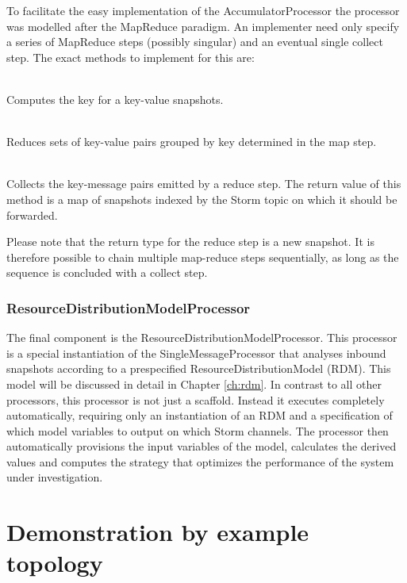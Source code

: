 To facilitate the easy implementation of the AccumulatorProcessor the processor was modelled after the MapReduce paradigm\cite{map-reduce}. An implementer need only specify a series of MapReduce steps (possibly singular) and an eventual single collect step.  The exact methods to implement for this are: 
\begin{description}[font=\normalfont]
\item[\emph{map(Message m) : String}] \hfill \\ Computes the key for a key-value snapshots.
\item[\emph{reduce(String key, List\textless Message\textgreater\ l) : Message}] \hfill \\ Reduces sets of key-value pairs grouped by key determined in the map step.
\item[\emph{collect(Map\textless String,Message\textgreater\ m) : Map\textless String,Message\textgreater}] \hfill \\ Collects the key-message pairs emitted by a reduce step. The return value of this method is a map of snapshots indexed by the Storm topic on which it should be forwarded.
\end{description}
Please note that the return type for the reduce step is a new snapshot. It is therefore possible to chain multiple map-reduce steps sequentially, as long as the sequence is concluded with a collect step.

\subsubsection*{ResourceDistributionModelProcessor}
The final component is the ResourceDistributionModelProcessor. This processor is a special instantiation of the SingleMessageProcessor that analyses inbound snapshots according to a prespecified ResourceDistributionModel (RDM). This model will be discussed in detail in Chapter \ref{ch:rdm}. In contrast to all other processors, this processor is not just a scaffold. Instead it executes completely automatically, requiring only an instantiation of an RDM and a specification of which model variables to output on which Storm channels. The processor then automatically provisions the input variables of the model, calculates the derived values and computes the strategy that optimizes the performance of the system under investigation.

\section{Demonstration by example topology}
\label{sec:example_application_topology}

